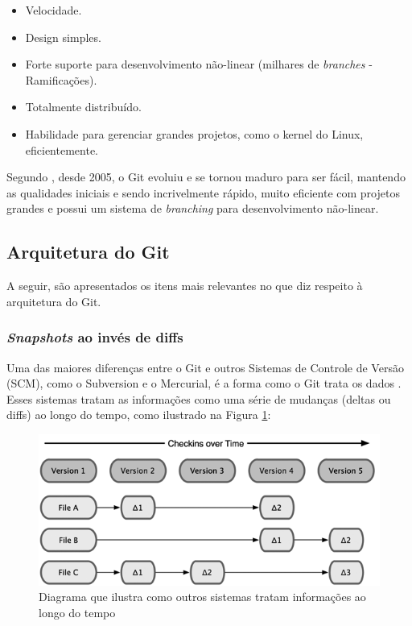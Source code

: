 \begin{itemize}
	\item Velocidade.
	\item Design simples.
	\item Forte suporte para desenvolvimento não-linear (milhares de \emph{branches} - Ramificações).
	\item Totalmente distribuído.
	\item Habilidade para gerenciar grandes projetos, como o kernel do Linux, eficientemente. 
\end{itemize}


Segundo \cite{progit}, desde 2005, o Git evoluiu e se tornou maduro para ser fácil, mantendo as qualidades iniciais e sendo incrivelmente rápido, muito eficiente com projetos grandes e possui um sistema de \emph{branching} para desenvolvimento não-linear.

\subsection{Arquitetura do Git}

A seguir, são apresentados os itens mais relevantes no que diz respeito à arquitetura do Git.

\subsubsection{\emph{Snapshots} ao invés de diffs}

Uma das maiores diferenças entre o Git e outros Sistemas de Controle de Versão (SCM), como o Subversion e o Mercurial, é a forma como o Git trata os dados \cite[p. 6]{progit}. Esses sistemas tratam as informações como uma série de mudanças (deltas ou diffs) ao longo do tempo, como ilustrado na Figura \ref{scm_delta}:

\begin{figure} [ht]
	\centering
	\includegraphics[scale=0.5]{scm_delta.png}
	\caption{Diagrama que ilustra como outros sistemas tratam informações ao longo do tempo\cite[p. 6]{progit}}
	\label{scm_delta}
\end{figure}

